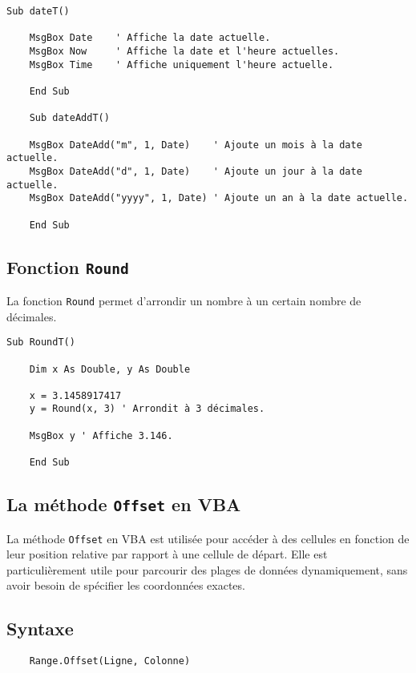 \documentclass[a4paper,12pt]{report}
\begin{document}
\begin{lstlisting}[caption=Exemples de fonctions de gestion des dates]
	Sub dateT()
	
	MsgBox Date    ' Affiche la date actuelle.
	MsgBox Now     ' Affiche la date et l'heure actuelles.
	MsgBox Time    ' Affiche uniquement l'heure actuelle.
	
	End Sub
	
	Sub dateAddT()
	
	MsgBox DateAdd("m", 1, Date)    ' Ajoute un mois à la date actuelle.
	MsgBox DateAdd("d", 1, Date)    ' Ajoute un jour à la date actuelle.
	MsgBox DateAdd("yyyy", 1, Date) ' Ajoute un an à la date actuelle.
	
	End Sub
\end{lstlisting}

\subsection{Fonction \texttt{Round}}
La fonction \texttt{Round} permet d'arrondir un nombre à un certain nombre de décimales.

\begin{lstlisting}[caption=Exemple de fonction Round]
	Sub RoundT()
	
	Dim x As Double, y As Double
	
	x = 3.1458917417
	y = Round(x, 3) ' Arrondit à 3 décimales.
	
	MsgBox y ' Affiche 3.146.
	
	End Sub
\end{lstlisting}

\subsection{La méthode \texttt{Offset} en VBA}

La méthode \texttt{Offset} en VBA est utilisée pour accéder à des cellules en fonction de leur position relative par rapport à une cellule de départ. Elle est particulièrement utile pour parcourir des plages de données dynamiquement, sans avoir besoin de spécifier les coordonnées exactes.

\subsection*{Syntaxe}
\begin{verbatim}
	Range.Offset(Ligne, Colonne)
\end{verbatim}
\end{document}
